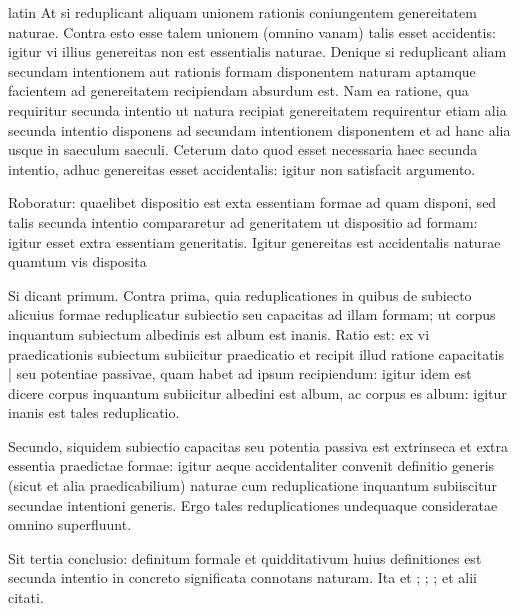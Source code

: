 \begin{otherlanguage*}{latin}
\pstart
At si reduplicant aliquam unionem rationis coniungentem genereitatem naturae. Contra esto esse talem unionem (omnino vanam) talis esset accidentis:
igitur vi illius genereitas non est essentialis naturae. Denique si reduplicant aliam secundam intentionem aut rationis formam disponentem naturam aptamque facientem ad genereitatem recipiendam absurdum est. Nam ea ratione, qua requiritur secunda intentio ut natura recipiat genereitatem requirentur etiam alia secunda intentio disponens ad secundam intentionem disponentem et ad hanc alia usque in saeculum saeculi. Ceterum dato quod esset necessaria haec secunda intentio, adhuc genereitas esset accidentalis:
igitur non satisfacit argumento. 
\pend

\pstart
Roboratur:
quaelibet dispositio est exta essentiam formae ad quam disponi, sed talis secunda intentio compararetur ad generitatem ut dispositio ad formam:
igitur esset extra essentiam generitatis. Igitur genereitas est accidentalis naturae quamtum vis disposita 
\pend

\pstart
Si dicant primum. Contra prima, quia reduplicationes in quibus de subiecto alicuius formae reduplicatur subiectio seu capacitas ad illam formam; ut corpus inquantum subiectum albedinis est album est inanis. Ratio est:
ex vi praedicationis subiectum subiicitur praedicatio et recipit illud ratione capacitatis \textnormal{|} seu potentiae passivae, quam habet ad ipsum recipiendum:
igitur idem est dicere corpus inquantum subiicitur albedini est album, ac corpus es album:
igitur inanis est tales reduplicatio. 
\pend

\pstart
Secundo, siquidem subiectio capacitas seu potentia passiva est extrinseca et extra essentia praedictae formae:
igitur aeque accidentaliter convenit definitio generis (sicut et alia praedicabilium) naturae cum reduplicatione inquantum subiiscitur secundae intentioni generis. Ergo tales reduplicationes undequaque consideratae omnino superfluunt. 
\pend

\pstart
Sit tertia conclusio:
definitum formale et quidditativum huius definitiones est secunda intentio in concreto significata connotans naturam. Ita  et ; ; ;  et alii citati. 
\pend


\end{otherlanguage*}
